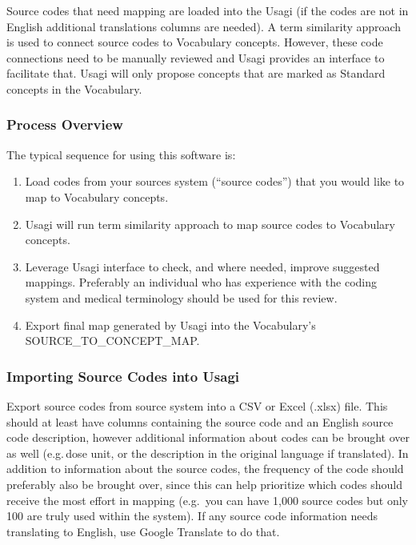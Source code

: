\documentclass[11pt]{book}
\providecommand{\tightlist}{%
  \setlength{\itemsep}{0pt}\setlength{\parskip}{0pt}}
\theoremstyle{definition}
\theoremstyle{definition}
\theoremstyle{definition}
\theoremstyle{remark}
\begin{document}
Source codes that need mapping are loaded into the Usagi (if the codes are not in English additional translations columns are needed). A term similarity approach is used to connect source codes to Vocabulary concepts. However, these code connections need to be manually reviewed and Usagi provides an interface to facilitate that. Usagi will only propose concepts that are marked as Standard concepts in the Vocabulary.

\hypertarget{process-overview-2}{%
\subsubsection*{Process Overview}\label{process-overview-2}}

The typical sequence for using this software is:

\begin{enumerate}
\def\labelenumi{\arabic{enumi}.}
\tightlist
\item
  Load codes from your sources system (``source codes'') that you would like to map to Vocabulary concepts.
\item
  Usagi will run term similarity approach to map source codes to Vocabulary concepts.
\item
  Leverage Usagi interface to check, and where needed, improve suggested mappings. Preferably an individual who has experience with the coding system and medical terminology should be used for this review.
\item
  Export final map generated by Usagi into the Vocabulary's SOURCE\_TO\_CONCEPT\_MAP.
\end{enumerate}

\hypertarget{importing-source-codes-into-usagi}{%
\subsubsection*{Importing Source Codes into Usagi}\label{importing-source-codes-into-usagi}}

Export source codes from source system into a CSV or Excel (.xlsx) file. This should at least have columns containing the source code and an English source code description, however additional information about codes can be brought over as well (e.g.\,dose unit, or the description in the original language if translated). In addition to information about the source codes, the frequency of the code should preferably also be brought over, since this can help prioritize which codes should receive the most effort in mapping (e.g.~you can have 1,000 source codes but only 100 are truly used within the system). If any source code information needs translating to English, use Google Translate to do that.
\end{document}
